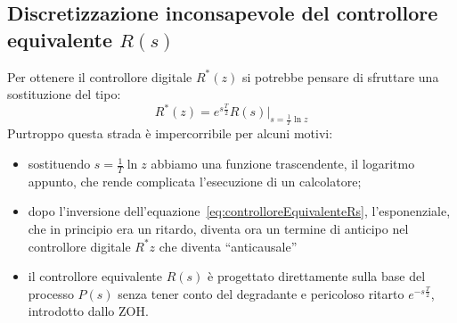 \documentclass[a4paper]{report}
\begin{document}
\subsection{Discretizzazione inconsapevole del controllore equivalente
$R(s)$}
Per ottenere il controllore digitale $R^{*}(z)$ si potrebbe pensare di
sfruttare una sostituzione del tipo:
\[
R^{*}(z) = e^{s \frac{T}{2}}R(s)|_{s = \frac{1}{T}\ln z}
\]
Purtroppo questa strada \`e impercorribile per alcuni motivi:
\begin{itemize}
\item sostituendo $s = \frac{1}{T}\ln z$ abbiamo una funzione
  trascendente, il logaritmo appunto, che rende complicata
  l'esecuzione di un calcolatore;
\item dopo l'inversione
  dell'equazione~\ref{eq:controlloreEquivalenteRs}, l'esponenziale,
  che in principio era un ritardo, diventa ora un termine di anticipo
  nel controllore digitale $R^{*}{z}$ che diventa ``anticausale''
\item il controllore equivalente $R(s)$ \`e progettato direttamente
  sulla base del processo $P(s)$ senza tener conto del degradante e
  pericoloso ritarto $e^{-s \frac{T}{2}}$, introdotto dallo ZOH.
\end{itemize}
\end{document}
